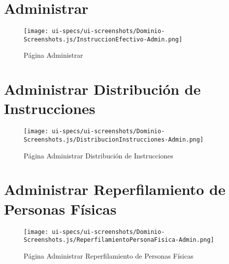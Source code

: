 \section{Administrar } \label{sec:cf-ui-admin-instruccionefectivo}

\begin{figure}[H]
        \label{tab:ui-search-instruccionefectivo-page}
        \texttt{[image: ui-specs/ui-screenshots/Dominio-Screenshots.js/InstruccionEfectivo-Admin.png]}
        \caption{P\'agina Administrar }
\end{figure}


\section{Administrar Distribuci\'on de Instrucciones} \label{sec:cf-ui-admin-distribucioninstrucciones}

\begin{figure}[H]
        \label{tab:ui-search-distribucioninstrucciones-page}
        \texttt{[image: ui-specs/ui-screenshots/Dominio-Screenshots.js/DistribucionInstrucciones-Admin.png]}
        \caption{P\'agina Administrar Distribuci\'on de Instrucciones}
\end{figure}


\section{Administrar Reperfilamiento de Personas F\'isicas} \label{sec:cf-ui-admin-reperfilamientopersonafisica}

\begin{figure}[H]
        \label{tab:ui-search-reperfilamientopersonafisica-page}
        \texttt{[image: ui-specs/ui-screenshots/Dominio-Screenshots.js/ReperfilamientoPersonaFisica-Admin.png]}
        \caption{P\'agina Administrar Reperfilamiento de Personas F\'isicas}
\end{figure}
\clearpage
